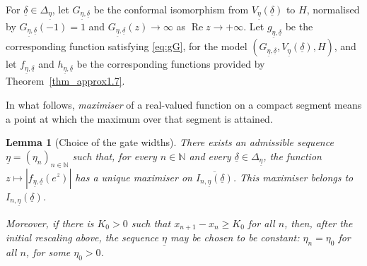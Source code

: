 \documentclass[a4paper, 11pt, reqno]{amsart}
\numberwithin{equation}{section}
\theoremstyle{plain}
\newtheorem{lemma}[theorem]{Lemma}
\theoremstyle{remark}
\newcommand{\N}{{\mathbb{N}}}
\newcommand{\uldelta}{\underline{\delta}}
\newcommand{\uleta}{\underline{\eta}}
\newcommand{\Rea}{\operatorname{Re }}
\begin{document}
For \(\uldelta\in\Delta_{\uleta}\), let \(G_{\uleta,\uldelta}\) be the conformal isomorphism from \(V_{\uleta}(\uldelta)\) to \(H\), normalised by \(G_{\uleta,\uldelta}(-1)=1\) and \(G_{\uleta,\uldelta}(z)\to\infty\) as \(\Rea z\to+\infty\). Let \(g_{\uleta,\uldelta}\) be the corresponding function satisfying \eqref{eq:gG}, for the model \((G_{\uleta,\uldelta},V_{\uleta}(\uldelta),H)\), and let \(f_{\uleta,\uldelta}\) and \(h_{\uleta,\uldelta}\) be the corresponding functions provided by Theorem~\ref{thm_approx1.7}.

In what follows, \emph{maximiser} of a real-valued function on a compact segment means a point at which the maximum over that segment is attained.

\begin{lemma}[Choice of the gate widths]\label{lem:narrow_gate_unique}
	There exists an admissible sequence \(\uleta=(\eta_n)_{n\in\N}\) such that, for every \(n\in\N\) and every \(\uldelta\in\Delta_{\uleta}\), the function \(z\mapsto |f_{\uleta,\uldelta}(e^z)|\) has a unique maximiser on \(\overline{I_{n,\uleta}(\uldelta)}\). This maximiser belongs to \(I_{n,\uleta}(\uldelta)\).
	
	Moreover, if there is \(K_0>0\) such that \(x_{n+1}-x_n\ge K_0\) for all \(n\), then, after the initial rescaling above, the sequence \(\uleta\) may be chosen to be constant: \(\eta_n=\eta_0\) for all \(n\), for some \(\eta_0>0\).
\end{lemma}
\end{document}
